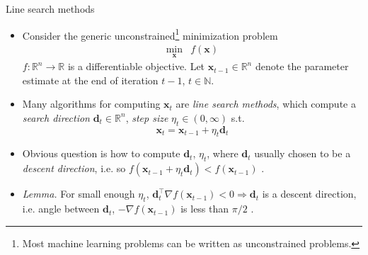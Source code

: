 \documentclass{beamer}
\numberwithin{equation}{section}
\begin{document}
\begin{frame}{Line search methods}
    \begin{itemize}
        \item
        Consider the generic unconstrained\footnote{
            Most machine learning problems can be written as unconstrained
            problems.
        } minimization problem
        \begin{equation} \label{eq:unconstrained_min}
            \begin{array}{ll}
                \displaystyle\min_\mathbf{x} & f(\mathbf{x})
            \end{array}
        \end{equation}
        $ f : \mathbb{R}^n \rightarrow \mathbb{R} $ is a differentiable
        objective. Let $ \mathbf{x}_{t - 1} \in \mathbb{R}^n $ denote the
        parameter estimate at the end of iteration $ t - 1 $,
        $ t \in \mathbb{N} $.

        \item
        Many algorithms for computing $ \mathbf{x}_t $ are
        \textit{line search methods}, which compute a \textit{search direction}
        $ \mathbf{d}_t \in \mathbb{R}^n $, \textit{step size}
        $ \eta_t \in (0, \infty) $ s.t. \cite{nocedal_opt}
        \begin{equation} \label{eq:line_search_eq}
            \mathbf{x}_t = \mathbf{x}_{t - 1} + \eta_t\mathbf{d}_t
        \end{equation}

        \item
        Obvious question is how to compute $ \mathbf{d}_t $, $ \eta_t $, where
        $ \mathbf{d}_t $ usually chosen to be a \textit{descent direction},
        i.e. so $ f(\mathbf{x}_{t - 1} + \eta_t\mathbf{d}_t) <
        f(\mathbf{x}_{t - 1}) $ \cite{nocedal_opt}.

        \item
        \textit{Lemma.} For small enough $ \eta_t $, $ \mathbf{d}_t^\top
        \nabla f(\mathbf{x}_{t - 1}) < 0 \Rightarrow \mathbf{d}_t $ is a
        descent direction, i.e. angle between $ \mathbf{d}_t $,
        $ -\nabla f(\mathbf{x}_{t - 1}) $ is less than $ \pi / 2 $
        \cite{nocedal_opt}.
    \end{itemize}

    \medskip
\end{frame}
\end{document}
